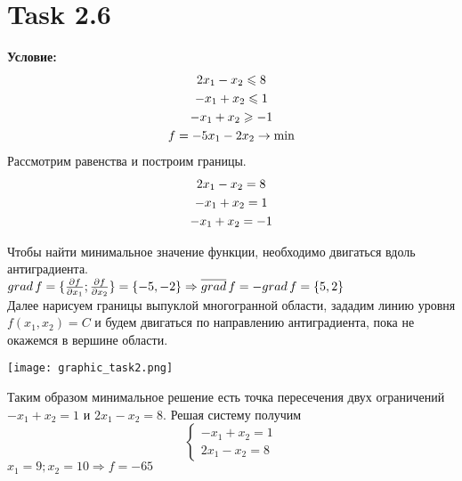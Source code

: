 \documentclass[12pt]{article}
\begin{document}
\section*{Task 2.6}

\textbf{Условие:}
\begin{gather}
2x_1-x_2\leqslant 8 \notag\\
-x_1+x_2\leqslant 1\\
-x_1+x_2\geqslant -1\notag\\
f=-5x_1-2x_2\to \min \notag
\end{gather}
Рассмотрим равенства и построим границы.
\begin{gather}
2x_1-x_2= 8 \notag\\
-x_1+x_2= 1\\
-x_1+x_2= -1\notag
\end{gather}

Чтобы найти минимальное значение функции, необходимо двигаться вдоль антиградиента.\\
$grad\, f = \{\frac{\partial f}{\partial x_1};\frac{\partial f}{\partial x_2}\}=\{-5, -2\}\\
\Rightarrow \overline{grad}\, f=-grad\, f=\{5, 2\}$\\

Далее нарисуем границы выпуклой многогранной области, зададим линию уровня $f(x_1,x_2)=C$ и
будем двигаться по направлению антиградиента, пока не окажемся в вершине области.
\begin{center}
\texttt{[image: graphic\_task2.png]}\\
\end{center}

Таким образом минимальное решение есть точка пересечения двух ограничений $-x_1+x_2= 1 $ и $2x_1-x_2= 8 $.
Решая систему получим\\
\begin{equation}
  \begin{cases}
  -x_1+x_2= 1 \\
  2x_1-x_2= 8
\end{cases}
\end{equation}
$x_1=9;x_2=10\Rightarrow f = -65$
\end{document}
